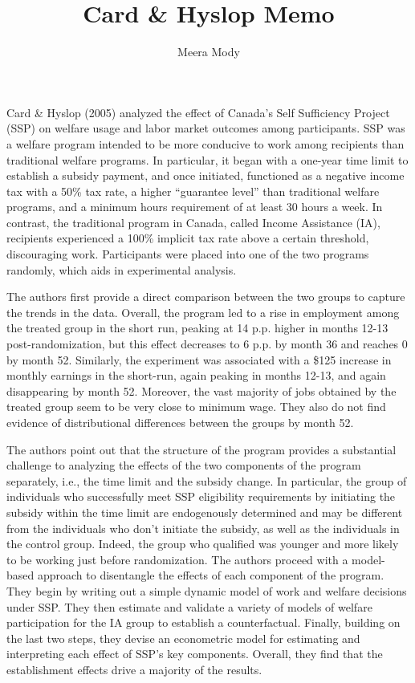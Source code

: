 \documentclass[12pt]{article}
\title{Card \& Hyslop Memo}
\author{Meera Mody}
\begin{document}
Card \& Hyslop (2005) 
analyzed the effect of 
Canada's Self Sufficiency Project (SSP)
on welfare usage and labor market outcomes 
among participants.
SSP was a welfare program intended 
to be more conducive to work 
among recipients than 
traditional welfare programs.
In particular, it began with a one-year 
time limit to establish a subsidy payment, and once 
initiated, functioned as a negative income tax with 
a 50\% tax rate, a higher ``guarantee level'' than 
traditional welfare programs, and a 
minimum hours requirement 
of at least 30 hours a week.
In contrast, the traditional program in Canada,
called Income Assistance (IA), recipients 
experienced a 100\% implicit tax rate above 
a certain threshold, discouraging work.
Participants were placed into one of the 
two programs randomly, which aids in 
experimental analysis. 

The authors first provide a 
direct comparison between the two groups 
to capture the trends in the data.
Overall, the program 
led to a rise in employment 
among the treated group in the 
short run, peaking 
at 14 p.p. higher in months 12-13 
post-randomization, but this 
effect decreases to 
6 p.p. by month 36 and 
reaches 0 by month 52. 
Similarly, 
the experiment was associated with a 
\$125 increase in monthly earnings in the short-run,
again peaking in months 12-13, 
and again disappearing by month 52. 
Moreover, the vast majority 
of jobs obtained by the treated group
seem to be very close to minimum wage.
They also do not find evidence of 
distributional differences between the 
groups by month 52.

The authors point out that the structure 
of the program provides 
a substantial challenge to analyzing the 
effects of the two components of 
the program separately, i.e., the 
time limit and the subsidy change.
In particular, the group of individuals
who successfully meet SSP eligibility 
requirements by initiating the subsidy
within the time limit are endogenously 
determined and may be different 
from the individuals who don't initiate the subsidy,
as well as the individuals in the control group.
Indeed, the group who qualified 
was younger and more likely to be 
working just before randomization.
The authors proceed with a model-based 
approach to disentangle the effects of 
each component of the program.
They begin by writing out a simple 
dynamic model of work and welfare decisions 
under SSP. They then estimate and validate a variety of 
models of welfare participation for the 
IA group
to establish a counterfactual.  
Finally, building on the last two steps, 
they devise an econometric model 
for estimating and interpreting each 
effect of SSP's key components.
Overall, they find that the establishment 
effects drive a majority of the results.
\end{document}
